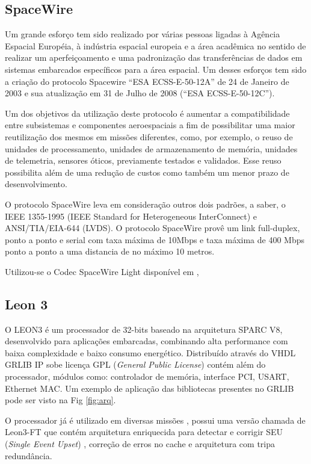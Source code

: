 \documentclass[journal,a4paper,oneside,twocolumn]{IEEEtran}
\begin{document}
	
\subsection{SpaceWire}

	Um grande esforço tem sido realizado por várias pessoas ligadas à Agência Espacial Européia, à indústria espacial europeia e a área acadêmica no sentido de realizar um aperfeiçoamento e uma padronização das transferências de dados em sistemas embarcados específicos para a área espacial. Um desses esforços tem sido a criação do protocolo Spacewire “ESA ECSS-E-50-12A” de 24 de Janeiro de 2003 e sua atualização em 31 de Julho de 2008 (“ESA ECSS-E-50-12C”).

	Um dos  objetivos da utilização deste protocolo é aumentar a compatibilidade entre subsistemas e componentes aeroespaciais a fim de possibilitar  uma maior reutilização dos mesmos em missões diferentes, como, por exemplo, o reuso de unidades de processamento, unidades de armazenamento de memória, unidades de telemetria, sensores óticos, previamente testados e validados. Esse reuso possibilita além de uma redução de custos como também um menor prazo de desenvolvimento.
	
	O protocolo SpaceWire leva em consideração outros dois padrões, a saber, o IEEE 1355-1995  (IEEE Standard for Heterogeneous InterConnect) e ANSI/TIA/EIA-644 (LVDS). O protocolo SpaceWire provê um link full-duplex, ponto a ponto e serial com taxa máxima de 10Mbps e taxa máxima de 400 Mbps ponto a ponto a uma distancia de no máximo 10 metros.

	Utilizou-se o Codec SpaceWire Light disponível em , 
	
\subsection{Leon 3}

	O LEON3 é um processador de 32-bits baseado na arquitetura SPARC V8, desenvolvido para aplicações embarcadas, combinando alta 	performance com baixa complexidade e baixo consumo energético. Distribuído 	através do VHDL GRLIB IP \cite{GRLIB} sobe licença GPL (\textit{General Public License}) contém além do processador, módulos como: controlador de 	memória, interface PCI, USART, Ethernet MAC. Um exemplo de aplicação das bibliotecas presentes  no GRLIB pode ser visto na Fig \ref{fig:arq}. 

	O processador já é utilizado em diversas missões \cite{},  possui uma versão chamada de Leon3-FT que contém arquitetura enriquecida para detectar e corrigir SEU (\textit{Single Event Upset}) , correção de erros no cache e arquitetura com tripa redundância.
\end{document}

